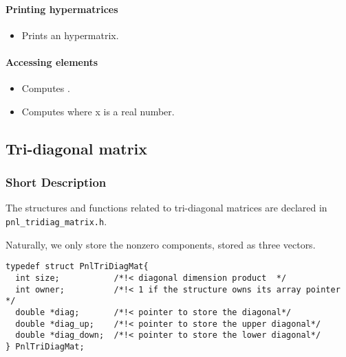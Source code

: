 \paragraph{Printing hypermatrices}

\begin{itemize}
\item {}
  \sshortdescribe Prints an hypermatrix.
\end{itemize}

\paragraph{Accessing elements}

\begin{itemize}
\item {}
  \sshortdescribe Computes .
  
\item {}
  \sshortdescribe Computes  where x is a real number.
\end{itemize}



\subsection{Tri-diagonal matrix}
\subsubsection{Short Description}

The structures and functions related to tri-diagonal matrices are declared in
\verb!pnl_tridiag_matrix.h!. 

Naturally, we only store the nonzero components, stored as three vectors.

\begin{verbatim}
typedef struct PnlTriDiagMat{
  int size;           /*!< diagonal dimension product  */
  int owner;          /*!< 1 if the structure owns its array pointer */
  double *diag;       /*!< pointer to store the diagonal*/
  double *diag_up;    /*!< pointer to store the upper diagonal*/
  double *diag_down;  /*!< pointer to store the lower diagonal*/
} PnlTriDiagMat;
\end{verbatim}

